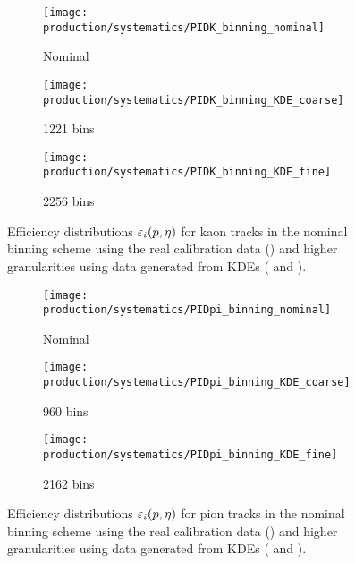 \begin{figure}
  \begin{subfigure}{0.32\textwidth}
    \centering
    \texttt{[image: production/systematics/PIDK\_binning\_nominal]}
    \caption{Nominal}
    \label{fig:prod:syst:pid:kde_2d_binning:kaon:nominal}
  \end{subfigure}
  \begin{subfigure}{0.32\textwidth}
    \centering
    \texttt{[image: production/systematics/PIDK\_binning\_KDE\_coarse]}
    \caption{1221 bins}
    \label{fig:prod:syst:pid:kde_2d_binning:kaon:coarse}
  \end{subfigure}
  \begin{subfigure}{0.32\textwidth}
    \centering
    \texttt{[image: production/systematics/PIDK\_binning\_KDE\_fine]}
    \caption{2256 bins}
    \label{fig:prod:syst:pid:kde_2d_binning:kaon:fine}
  \end{subfigure}

  \caption{%
    Efficiency distributions $\varepsilon_{i}(p,\eta)$ for kaon tracks in the
    nominal binning scheme using the real calibration data
    () and higher
    granularities using data generated from \aclp{KDE}
    ( and
    ).
  }
  \label{fig:prod:syst:pid:kde_2d_binning:kaon}
\end{figure}

\begin{figure}
  \begin{subfigure}{0.32\textwidth}
    \centering
    \texttt{[image: production/systematics/PIDpi\_binning\_nominal]}
    \caption{Nominal}
    \label{fig:prod:syst:pid:kde_2d_binning:pion:nominal}
  \end{subfigure}
  \begin{subfigure}{0.32\textwidth}
    \centering
    \texttt{[image: production/systematics/PIDpi\_binning\_KDE\_coarse]}
    \caption{960 bins}
    \label{fig:prod:syst:pid:kde_2d_binning:pion:coarse}
  \end{subfigure}
  \begin{subfigure}{0.32\textwidth}
    \centering
    \texttt{[image: production/systematics/PIDpi\_binning\_KDE\_fine]}
    \caption{2162 bins}
    \label{fig:prod:syst:pid:kde_2d_binning:pion:fine}
  \end{subfigure}

  \caption{%
    Efficiency distributions $\varepsilon_{i}(p,\eta)$ for pion tracks in the
    nominal binning scheme using the real calibration data
    () and higher
    granularities using data generated from \aclp{KDE}
    ( and
    ).
  }
  \label{fig:prod:syst:pid:kde_2d_binning:pion}
\end{figure}

